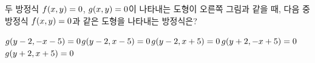 \noindent\begin{minipage}[t]{0.58\linewidth}\vspace{0pt}\raggedright 두 방정식 $f(x{,}\mkern3mu\mathopen{}y)=0$, $g(x{,}\mkern3mu\mathopen{}y)=0$이 나타내는 도형이 오른쪽 그림과 같을 때, 다음 중 방정식 $f(x{,}\mkern3mu\mathopen{}y)=0$과 같은 도형을 나타내는 방정식은?\end{minipage}\hfill\begin{minipage}[t]{0.4\linewidth}\vspace{0pt}\centering \resizebox{\ifdim\width>\linewidth\linewidth\else\width\fi}{!}{}\end{minipage}\par
\begin{choicesv}{$g(y-2{,}\mkern3mu\mathopen{}-x-5)=0$}{$g(y-2{,}\mkern3mu\mathopen{}x-5)=0$}{$g(y-2{,}\mkern3mu\mathopen{}x+5)=0$}{$g(y+2{,}\mkern3mu\mathopen{}-x+5)=0$}{$g(y+2{,}\mkern3mu\mathopen{}x+5)=0$}\end{choicesv}
